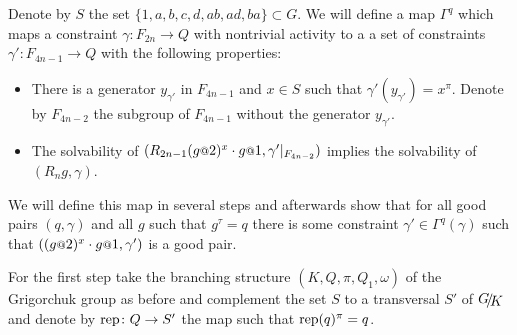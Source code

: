 \documentclass[a4paper,11pt]{amsart}
\begin{document}
Denote by $S$ the set $\{1,a,b,c,d,ab,ad,ba\}\subset G$.
We will define a map $\Gamma^q$ which maps a constraint $\gamma\colon F_{2n} \to Q$ with nontrivial activity to a a set of constraints $\gamma'\colon F_{4n-1}\to Q$ 
with the following properties:
\begin{itemize}
  \item There is a generator $y_{\gamma'}$ in $F_{4n-1}$ and $x\in S$ such that $\gamma'(y_{\gamma'})=x^\pi$. Denote by $F_{4n-2}$ the subgroup of $F_{4n-1}$ without the generator $y_{\gamma'}$.
  \item The solvability of $(R_{2n-1} (g\at{2})^x \cdot g\at{1},\gamma'|_{F_{4n-2}})$ implies
  the solvability of $(R_ng,\gamma)$.
 \end{itemize}

 We will define this map in several steps and afterwards show that for all good pairs $(q,\gamma)$ and all $g$ such that $g^\tau=q$ 
 there is some constraint $\gamma' \in \Gamma^q(\gamma)$ such that $((g\at{2})^x \cdot g\at{1},\gamma')$ is a good pair.
 
 For the first step take the branching structure $(K,Q,\pi,Q_1,\omega)$ of the Grigorchuk group as before and 
 complement the set $S$ to a transversal $S'$ of $\RNK{G}{K}$ and denote by $\textup{rep}\colon Q\to S'$ 
 the map such that $\textup{rep}(q)^\pi = q$.
 
\end{document}
